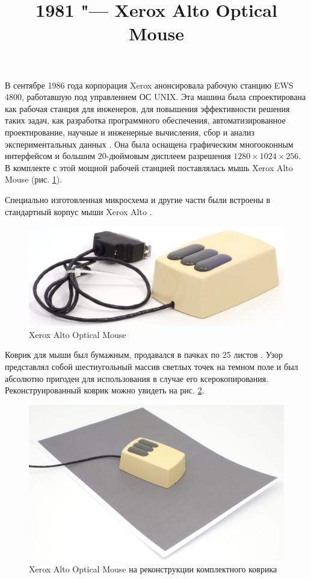 \documentclass[11pt, a4paper]{article}
\begin{document}
\title{1981 "--- Xerox Alto Optical Mouse}
\date{}
\maketitle
{}
В сентябре 1986 года корпорация Xerox анонсировала рабочую станцию EWS 4800, работавшую под управлением ОС UNIX. Эта машина была спроектирована как рабочая станция для инженеров, для повышения эффективности решения таких задач, как разработка программного обеспечения, автоматизированное проектирование, научные и инженерные вычисления, сбор и анализ экспериментальных данных \cite{yt}. Она была оснащена графическим многооконным интерфейсом и большим 20-дюймовым дисплеем разрешения $1280 \times 1024 \times 256$. В комплекте с этой мощной рабочей станцией поставлялась мышь Xerox Alto Mouse (рис. \ref{fig:XeroxAltoPic}).

Специально изготовленная микросхема и другие части были встроены в стандартный корпус мыши Xerox Alto \cite{vlsi82}.

\begin{figure}[h]
    \centering
    \includegraphics[scale=0.7]{1981_xerox_alto_mouse/pic_30.jpg}
    \caption{Xerox Alto Optical Mouse}
    \label{fig:XeroxAltoPic}
\end{figure}

Коврик для мыши был бумажным, продавался в пачках по 25 листов \cite{pad}. Узор представлял собой шестиугольный массив светлых точек на темном поле и был абсолютно пригоден для использования в случае его ксерокопирования. Реконструированный коврик можно увидеть на рис. \ref{fig:XeroxAltoPad}.

\begin{figure}[h]
    \centering
    \includegraphics[scale=0.4]{1981_xerox_alto_mouse/pad_30.jpg}
    \caption{Xerox Alto Optical Mouse на реконструкции комплектного коврика}
    \label{fig:XeroxAltoPad}
\end{figure}
\end{document}
